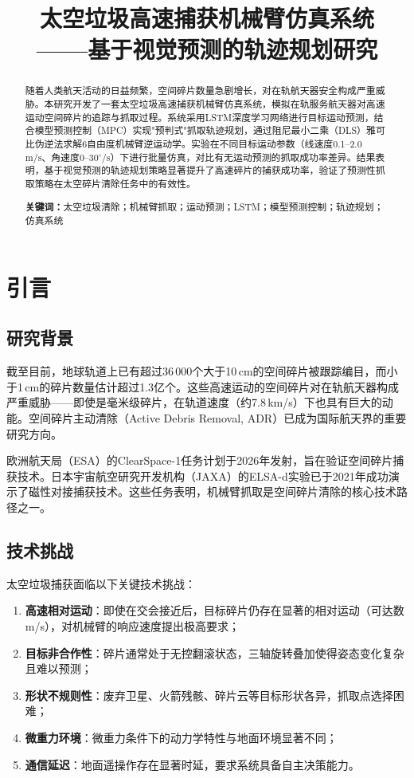 \documentclass[12pt,a4paper]{ctexart}
\title{\textbf{太空垃圾高速捕获机械臂仿真系统\\——基于视觉预测的轨迹规划研究}}
\author{}
\date{}
\begin{document}
\maketitle

\begin{abstract}
随着人类航天活动的日益频繁，空间碎片数量急剧增长，对在轨航天器安全构成严重威胁。本研究开发了一套太空垃圾高速捕获机械臂仿真系统，模拟在轨服务航天器对高速运动空间碎片的追踪与抓取过程。系统采用LSTM深度学习网络进行目标运动预测，结合模型预测控制（MPC）实现"预判式"抓取轨迹规划，通过阻尼最小二乘（DLS）雅可比伪逆法求解6自由度机械臂逆运动学。实验在不同目标运动参数（线速度0.1--2.0\,m/s、角速度0--30$^\circ$/s）下进行批量仿真，对比有无运动预测的抓取成功率差异。结果表明，基于视觉预测的轨迹规划策略显著提升了高速碎片的捕获成功率，验证了预测性抓取策略在太空碎片清除任务中的有效性。

\noindent\textbf{关键词：}太空垃圾清除；机械臂抓取；运动预测；LSTM；模型预测控制；轨迹规划；仿真系统
\end{abstract}

\section{引言}

\subsection{研究背景}

截至目前，地球轨道上已有超过36\,000个大于10\,cm的空间碎片被跟踪编目，而小于1\,cm的碎片数量估计超过1.3亿个。这些高速运动的空间碎片对在轨航天器构成严重威胁——即使是毫米级碎片，在轨道速度（约7.8\,km/s）下也具有巨大的动能。空间碎片主动清除（Active Debris Removal, ADR）已成为国际航天界的重要研究方向\cite{bonnal2013}。

欧洲航天局（ESA）的ClearSpace-1任务计划于2026年发射，旨在验证空间碎片捕获技术。日本宇宙航空研究开发机构（JAXA）的ELSA-d实验已于2021年成功演示了磁性对接捕获技术。这些任务表明，机械臂抓取是空间碎片清除的核心技术路径之一\cite{shan2016}。

\subsection{技术挑战}

太空垃圾捕获面临以下关键技术挑战：
\begin{enumerate}[label=(\arabic*)]
  \item \textbf{高速相对运动}：即使在交会接近后，目标碎片仍存在显著的相对运动（可达数m/s），对机械臂的响应速度提出极高要求；
  \item \textbf{目标非合作性}：碎片通常处于无控翻滚状态，三轴旋转叠加使得姿态变化复杂且难以预测；
  \item \textbf{形状不规则性}：废弃卫星、火箭残骸、碎片云等目标形状各异，抓取点选择困难；
  \item \textbf{微重力环境}：微重力条件下的动力学特性与地面环境显著不同；
  \item \textbf{通信延迟}：地面遥操作存在显著时延，要求系统具备自主决策能力。
\end{enumerate}
\end{document}
